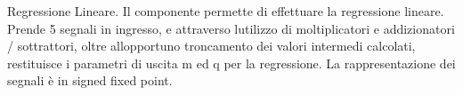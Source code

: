 Regressione Lineare. Il componente permette di effettuare la regressione lineare. Prende 5 segnali in ingresso, e attraverso l\textquotesingle{}utilizzo di moltiplicatori e addizionatori / sottrattori, oltre all\textquotesingle{}opportuno troncamento dei valori intermedi calcolati, restituisce i parametri di uscita m ed q per la regressione. La rappresentazione dei segnali è in signed fixed point.  